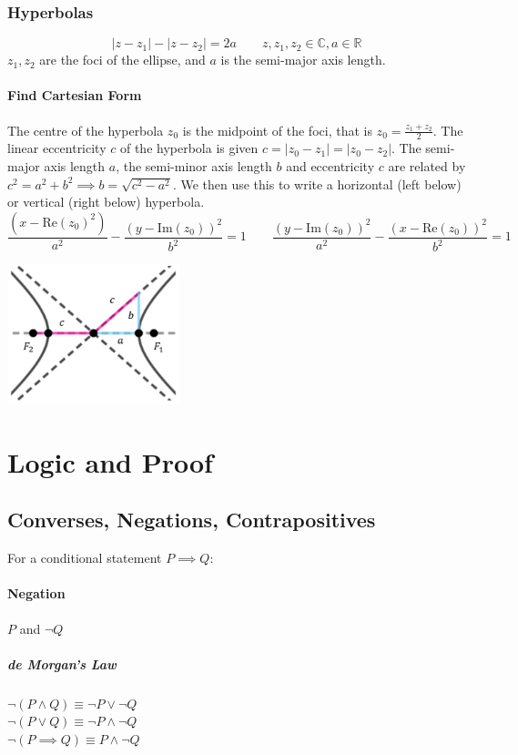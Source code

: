 \documentclass[a4paper,twoside]{article}
\begin{document}
			\subsubsection{Hyperbolas}
				\[
					|z-z_1|-|z-z_2|=2a \qquad z,z_1,z_2\in\mathbb{C},a\in\mathbb{R}
				\]
				$z_1,z_2$ are the foci of the ellipse, and $a$ is the semi-major axis length.\\
				\begin{minipage}{0.7\textwidth}
					\paragraph{Find Cartesian Form} The centre of the hyperbola $z_0$ is the midpoint of the foci, that is $\displaystyle z_0=\frac{z_1+z_2}{2}$. The linear eccentricity $c$ of the hyperbola is given $c=|z_0-z_1|=|z_0-z_2|$. The semi-major axis length $a$, the semi-minor axis length $b$ and eccentricity $c$ are related by $c^2=a^2+b^2\implies b=\sqrt{c^2-a^2}$. We then use this to write a horizontal (left below) or vertical (right below) hyperbola.
					\[
						\frac{\left(x-\mathrm{Re}(z_0)^2\right)}{a^2}-\frac{\left(y-\mathrm{Im}(z_0)\right)^2}{b^2}=1 \qquad \frac{\left(y-\mathrm{Im}(z_0)\right)^2}{a^2}-\frac{\left(x-\mathrm{Re}(z_0)\right)^2}{b^2}=1
					\]
				\end{minipage}
				\begin{minipage}{0.3\textwidth}
					\includegraphics[width=5cm]{complexhyperbola.png}
				\end{minipage}				
	\section{Logic and Proof}
		\subsection{Converses, Negations, Contrapositives}
			For a conditional statement $P\implies Q$:
			\paragraph{Negation} $P$ and $\neg Q$
				\subparagraph{de Morgan's Law} $\neg(P\land Q)\equiv\neg P\lor\neg Q$\\
				$\neg(P\lor Q)\equiv\neg P\land\neg Q$\\
				$\neg(P\implies Q)\equiv P\land \neg Q$
\end{document}
